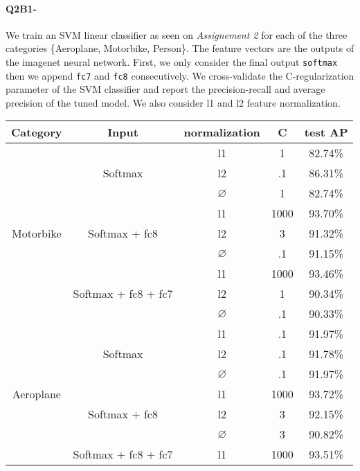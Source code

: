 \documentclass[11pt]{article}
\newcommand{\1}{\mathbbm{1}}
\newcommand{\0}{\mathbf{0}}
\begin{document}
	\paragraph{Q2B1-}
		We train an SVM linear classifier as seen on \textit{Assignement 2} for each of the three categories \{Aeroplane, Motorbike, Person\}. The feature vectors are the outputs of the imagenet neural network. First, we only consider the final output \texttt{softmax} then we append \texttt{fc7} and \texttt{fc8} consecutively. We cross-validate the C-regularization parameter of the SVM classifier and report the precision­-recall and average precision of the tuned model. We also consider l1 and l2 feature normalization.
		\begin{table}[H]
			\centering
			\begin{tabular}{|c|c|c|c|c|}
			\hline
			Category & Input & normalization & C & test AP \\
			\hline
			\multirow{9}{*}{Motorbike} &\multirow{3}{*}{Softmax}  &l1& 1 & 82.74\%\\
							   									  &&l2& .1 & 86.31\%\\
							   									  &&$\varnothing$& 1 & 82.74\%\\
							   									  \cline{2-5}
							   			&\multirow{3}{*}{Softmax + fc8}  &l1& 1000 & 93.70\%\\
							   									         &&l2& 3 & 91.32\%\\
							   									         &&$\varnothing$& .1 & 91.15\%\\
							   									   \cline{2-5}
							   		    &\multirow{3}{*}{Softmax + fc8 + fc7}  &l1& 1000 & 93.46\%\\
							   									               &&l2& 1 & 90.34\%\\
							   									               &&$\varnothing$& .1 & 90.33\%\\
			\hline
			\multirow{9}{*}{Aeroplane} & \multirow{3}{*}{Softmax}  &l1& .1 & 91.97\%\\
							   									   &&l2& .1 & 91.78\%\\
							   									   &&$\varnothing$& .1 & 91.97\%\\
							   									   \cline{2-5}
							   		   & \multirow{3}{*}{Softmax + fc8}  &l1& 1000 & 93.72\%\\
							   									         &&l2& 3 & 92.15\%\\
							   									         &&$\varnothing$& 3 & 90.82\%\\
							   									    \cline{2-5}
							   		   & \multirow{3}{*}{Softmax + fc8 + fc7}  &l1& 1000 & 93.51\%\\

\end{tabular}
\end{table}
\end{document}
